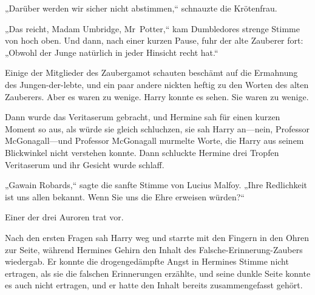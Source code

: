 „Darüber werden wir sicher nicht abstimmen,“ schnauzte die Krötenfrau.

„Das reicht, Madam Umbridge, Mr~Potter,“ kam Dumbledores strenge Stimme von hoch oben.
Und dann, nach einer kurzen Pause, fuhr der alte Zauberer fort:
„Obwohl der Junge natürlich in jeder Hinsicht recht hat.“

Einige der Mitglieder des Zaubergamot schauten beschämt auf die Ermahnung des Jungen-der-lebte, und ein paar andere nickten heftig zu den Worten des alten Zauberers. Aber es waren zu wenige. Harry konnte es sehen. Sie waren zu wenige.

Dann wurde das Veritaserum gebracht, und Hermine sah für einen kurzen Moment so aus, als würde sie gleich schluchzen, sie sah Harry an—nein, Professor McGonagall—und Professor McGonagall murmelte Worte, die Harry aus seinem Blickwinkel nicht verstehen konnte. Dann schluckte Hermine drei Tropfen Veritaserum und ihr Gesicht wurde schlaff.

„Gawain Robards,“ sagte die sanfte Stimme von Lucius Malfoy. „Ihre Redlichkeit ist uns allen bekannt. Wenn Sie uns die Ehre erweisen würden?“

Einer der drei Auroren trat vor.

Nach den ersten Fragen sah Harry weg und starrte mit den Fingern in den Ohren zur Seite, während Hermines Gehirn den Inhalt des Falsche-Erinnerung-Zaubers wiedergab. Er konnte die drogengedämpfte Angst in Hermines Stimme nicht ertragen, als sie die falschen Erinnerungen erzählte, und seine dunkle Seite konnte es auch nicht ertragen, und er hatte den Inhalt bereits zusammengefasst gehört.

